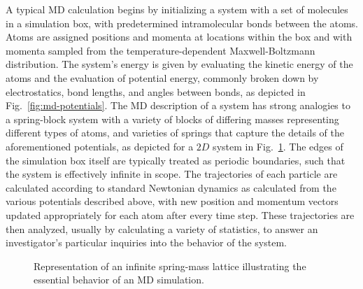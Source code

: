 A typical MD calculation begins by initializing a system with a set of molecules in a simulation box, with predetermined intramolecular bonds between the atoms.  Atoms are assigned positions and momenta at locations within the box and with momenta sampled from the temperature-dependent Maxwell-Boltzmann distribution.  The system's energy is given by evaluating the kinetic energy of the atoms and the evaluation of potential energy, commonly broken down by electrostatics, bond lengths, and angles between bonds, as depicted in Fig.~\ref{fig:md-potentials}.  The MD description of a system has strong analogies to a spring-block system with a variety of blocks of differing masses representing different types of atoms, and varieties of springs that capture the details of the aforementioned potentials, as depicted for a $2D$ system in Fig.~\ref{fig:spring_mass_grid}.  The edges of the simulation box itself are typically treated as periodic boundaries, such that the system is effectively infinite in scope.  The trajectories of each particle are calculated according to standard Newtonian dynamics as calculated from the various potentials described above, with new position and momentum vectors updated appropriately for each atom after every time step.  These trajectories are then analyzed, usually by calculating a variety of statistics, to answer an investigator's particular inquiries into the behavior of the system.

\begin{figure}[!htbp]
  \centering
  \caption{Representation of an infinite spring-mass lattice illustrating the essential behavior of an MD simulation.}
  \label{fig:spring_mass_grid}
\end{figure}

